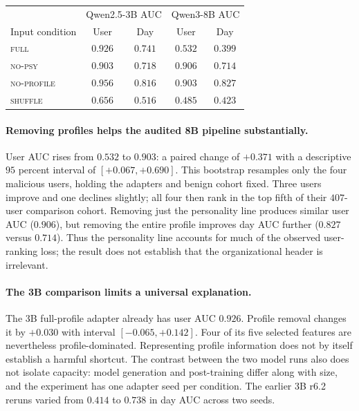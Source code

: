 \documentclass[10pt]{article} %
\begin{document}
\begin{center}
\begin{tabular}{lcccc}
\toprule
 & \multicolumn{2}{c}{Qwen2.5-3B AUC} & \multicolumn{2}{c}{Qwen3-8B AUC} \\
Input condition & User & Day & User & Day \\
\midrule
\textsc{full}       & $0.926$ & $0.741$ & $0.532$ & $0.399$ \\
\textsc{no-psy}     & $0.903$ & $0.718$ & $0.906$ & $0.714$ \\
\textsc{no-profile} & $0.956$ & $0.816$ & $0.903$ & $0.827$ \\
\textsc{shuffle}    & $0.656$ & $0.516$ & $0.485$ & $0.423$ \\
\bottomrule
\end{tabular}
\end{center}

\paragraph{Removing profiles helps the audited 8B pipeline substantially.}
User AUC rises from $0.532$ to $0.903$: a paired change of $+0.371$
with a descriptive $95$ percent interval of $[+0.067,+0.690]$. This
bootstrap resamples only the four malicious users, holding the adapters
and benign cohort fixed. Three users improve and one declines slightly;
all four then rank in the top fifth of their $407$-user comparison
cohort. Removing just the personality line produces similar user AUC
($0.906$), but removing the entire profile improves day AUC further
($0.827$ versus $0.714$). Thus the personality line accounts for much of
the observed user-ranking loss; the result does not establish that the
organizational header is irrelevant.

\paragraph{The 3B comparison limits a universal explanation.}
The 3B full-profile adapter already has user AUC $0.926$. Profile
removal changes it by $+0.030$ with interval $[-0.065,+0.142]$.
Four of its five selected features are nevertheless profile-dominated.
Representing profile information does not by itself establish a harmful
shortcut. The contrast between the two model runs also does not isolate
capacity: model generation and post-training differ along with size,
and the experiment has one adapter seed per condition. The earlier
3B r6.2 reruns varied from $0.414$ to $0.738$ in day AUC across two seeds.
\end{document}
